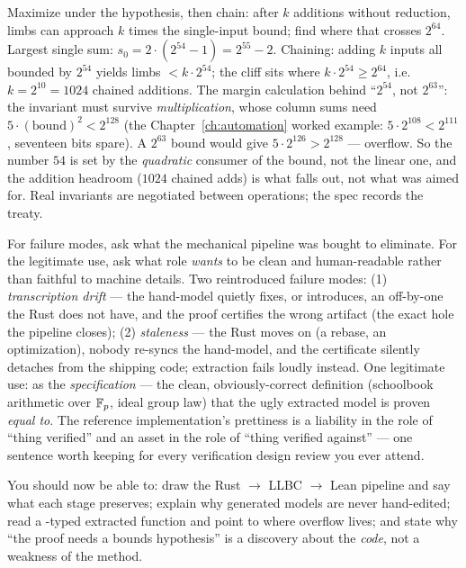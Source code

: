 \pathway Maximize under the hypothesis, then chain: after $k$ additions
without reduction, limbs can approach $k$ times the single-input bound;
find where that crosses $2^{64}$.
\answer Largest single sum: $s_0 = 2 \cdot (2^{54}-1) = 2^{55}-2$.
Chaining: adding $k$ inputs all bounded by $2^{54}$ yields limbs
$< k \cdot 2^{54}$; the  cliff sits where
$k \cdot 2^{54} \ge 2^{64}$, i.e.\ $k = 2^{10} = 1024$ chained additions.
The margin calculation behind ``$2^{54}$, not $2^{63}$'': the invariant
must survive \emph{multiplication}, whose column sums need
$5 \cdot (\text{bound})^2 < 2^{128}$ (the Chapter~\ref{ch:automation}
worked example: $5 \cdot 2^{108} < 2^{111}$, seventeen bits spare). A
$2^{63}$ bound would give $5 \cdot 2^{126} > 2^{128}$ --- overflow. So
the number $54$ is set by the \emph{quadratic} consumer of the bound, not
the linear one, and the addition headroom ($1024$ chained adds) is what
falls out, not what was aimed for. Real invariants are negotiated
between operations; the spec records the treaty.

\pathway For failure modes, ask what the mechanical pipeline was bought
to eliminate. For the legitimate use, ask what role \emph{wants} to be
clean and human-readable rather than faithful to machine details.
\answer Two reintroduced failure modes: (1) \emph{transcription drift} ---
the hand-model quietly fixes, or introduces, an off-by-one the Rust does
not have, and the proof certifies the wrong artifact (the exact hole the
pipeline closes); (2) \emph{staleness} --- the Rust moves on (a rebase,
an optimization), nobody re-syncs the hand-model, and the certificate
silently detaches from the shipping code; extraction fails loudly
instead. One legitimate use: as the \emph{specification} --- the clean,
obviously-correct definition (schoolbook arithmetic over $\mathbb{F}_p$, ideal
group law) that the ugly extracted model is proven \emph{equal to}. The
reference implementation's prettiness is a liability in the role of
``thing verified'' and an asset in the role of ``thing verified
against'' --- one sentence worth keeping for every verification design
review you ever attend.

\begin{checkpoint}
You should now be able to: draw the Rust $\to$ LLBC $\to$ Lean pipeline and
say what each stage preserves; explain why generated models are never
hand-edited; read a -typed extracted function and point to
where overflow lives; and state why ``the proof needs a bounds hypothesis''
is a discovery about the \emph{code}, not a weakness of the method.
\end{checkpoint}
